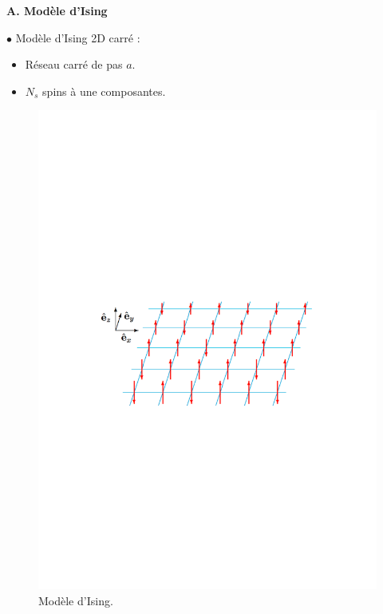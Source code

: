 \documentclass[9pt]{beamer}
\begin{document}
\setlength{\columnseprule}{0.4pt}
\begin{frame}
		\justifying
		\vspace*{22pt}

\textbf{A. Modèle d'Ising}



\begin{multicols}{2}

		$\bullet$ Modèle d'Ising 2D carré :
		\begin{itemize}
			\item Réseau carré de pas $a$.
			\item $N_s$ spins à une composantes.
		\end{itemize}
	
		
\begin{figure}[H]
\begin{center}
\includegraphics[scale =0.35]{Ising2D.pdf}
\caption{Modèle d'Ising.}
	\label{fig:schemaIsing}
	\end{center}
\end{figure}


\end{multicols}
\end{frame}
\end{document}
